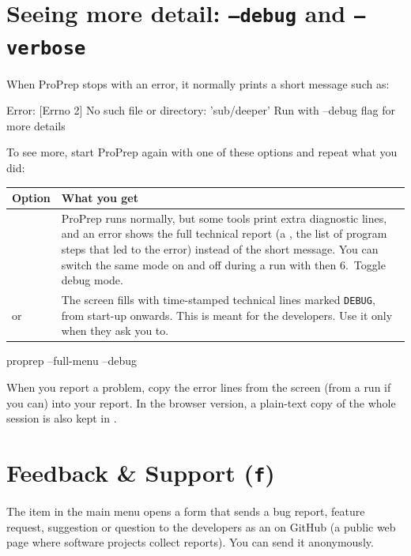 \section{Seeing more detail: \texttt{--debug} and \texttt{--verbose}}\label{sec:help-debug}

When ProPrep stops with an error, it normally prints a short message such as:

\begin{screen}
Error: [Errno 2] No such file or directory: 'sub/deeper'
Run with --debug flag for more details
\end{screen}

To see more, start ProPrep again with one of these options and repeat what you
did:

\begin{tabularx}{\linewidth}{@{}lL@{}}
\toprule
\textbf{Option} & \textbf{What you get} \\
\midrule
{} & ProPrep runs normally, but some tools print extra
diagnostic lines, and an error shows the full technical report (a
, the list of program steps that led to the error) instead of
the short message. You can switch the same mode on and off during a run with
 then \textsf{6.~Toggle debug mode}. \\
 or  & The screen fills with time-stamped technical
lines marked \texttt{DEBUG}, from start-up onwards. This is meant for the
developers. Use it only when they ask you to. \\
\bottomrule
\end{tabularx}

\begin{terminal}
proprep --full-menu --debug
\end{terminal}

\begin{tip}
When you report a problem, copy the error lines from the screen (from a
 run if you can) into your report. In the browser version, a
plain-text copy of the whole session is also kept in
.
\end{tip}

\section{Feedback \& Support (\texttt{f})}\label{sec:help-feedback}

The  item in the main menu opens a form that sends a bug report,
feature request, suggestion or question to the developers as an 
on GitHub (a public web page where software projects collect reports). You can
send it anonymously.

